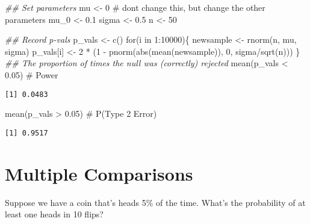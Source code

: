 \documentclass[
  letterpaper,
  DIV=11,
  numbers=noendperiod]{scrreprt}
\newenvironment{Shaded}{\begin{snugshade}}{\end{snugshade}}
\newcommand{\CommentTok}[1]{\textcolor[rgb]{0.37,0.37,0.37}{#1}}
\newcommand{\ControlFlowTok}[1]{\textcolor[rgb]{0.00,0.23,0.31}{#1}}
\newcommand{\DecValTok}[1]{\textcolor[rgb]{0.68,0.00,0.00}{#1}}
\newcommand{\DocumentationTok}[1]{\textcolor[rgb]{0.37,0.37,0.37}{\textit{#1}}}
\newcommand{\FloatTok}[1]{\textcolor[rgb]{0.68,0.00,0.00}{#1}}
\newcommand{\FunctionTok}[1]{\textcolor[rgb]{0.28,0.35,0.67}{#1}}
\newcommand{\NormalTok}[1]{\textcolor[rgb]{0.00,0.23,0.31}{#1}}
\newcommand{\OtherTok}[1]{\textcolor[rgb]{0.00,0.23,0.31}{#1}}
\newcommand{\SpecialCharTok}[1]{\textcolor[rgb]{0.37,0.37,0.37}{#1}}
\begin{document}
\begin{Shaded}
\begin{Highlighting}[]
\DocumentationTok{\#\# Set parameters}
\NormalTok{mu }\OtherTok{\textless{}{-}} \DecValTok{0} \CommentTok{\# don\textquotesingle{}t change this, but change the other parameters}
\NormalTok{mu\_0 }\OtherTok{\textless{}{-}} \FloatTok{0.1}
\NormalTok{sigma }\OtherTok{\textless{}{-}} \FloatTok{0.5}
\NormalTok{n }\OtherTok{\textless{}{-}} \DecValTok{50}

\DocumentationTok{\#\# Record p{-}vals}
\NormalTok{p\_vals }\OtherTok{\textless{}{-}} \FunctionTok{c}\NormalTok{()}
\ControlFlowTok{for}\NormalTok{(i }\ControlFlowTok{in} \DecValTok{1}\SpecialCharTok{:}\DecValTok{10000}\NormalTok{)\{}
\NormalTok{    newsample }\OtherTok{\textless{}{-}} \FunctionTok{rnorm}\NormalTok{(n, mu, sigma)}
\NormalTok{    p\_vals[i] }\OtherTok{\textless{}{-}} \DecValTok{2} \SpecialCharTok{*}\NormalTok{ (}\DecValTok{1} \SpecialCharTok{{-}} \FunctionTok{pnorm}\NormalTok{(}\FunctionTok{abs}\NormalTok{(}\FunctionTok{mean}\NormalTok{(newsample)), }\DecValTok{0}\NormalTok{, sigma}\SpecialCharTok{/}\FunctionTok{sqrt}\NormalTok{(n)))}
\NormalTok{\}}
\DocumentationTok{\#\# The proportion of times the null was (correctly) rejected}
\FunctionTok{mean}\NormalTok{(p\_vals }\SpecialCharTok{\textless{}} \FloatTok{0.05}\NormalTok{) }\CommentTok{\# Power}
\end{Highlighting}
\end{Shaded}

\begin{verbatim}
[1] 0.0483
\end{verbatim}

\begin{Shaded}
\begin{Highlighting}[]
\FunctionTok{mean}\NormalTok{(p\_vals }\SpecialCharTok{\textgreater{}} \FloatTok{0.05}\NormalTok{) }\CommentTok{\# P(Type 2 Error)}
\end{Highlighting}
\end{Shaded}

\begin{verbatim}
[1] 0.9517
\end{verbatim}

\hypertarget{multiple-comparisons}{%
\section{Multiple Comparisons}\label{multiple-comparisons}}

Suppose we have a coin that's heads 5\% of the time. What's the
probability of at least one heads in 10 flips?
\end{document}
